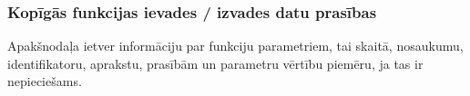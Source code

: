 \subsubsection{Kopīgās funkcijas ievades / izvades datu prasības}
Apakšnodaļa ietver informāciju par funkciju parametriem, tai skaitā, nosaukumu, identifikatoru, aprakstu, prasībām un parametru vērtību piemēru, ja tas ir nepieciešams.



